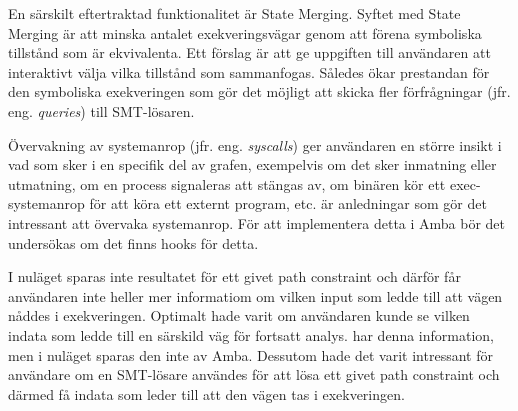 En särskilt eftertraktad funktionalitet är State Merging. Syftet
med State Merging är att minska antalet exekveringsvägar genom att förena
symboliska tillstånd som är ekvivalenta. Ett förslag är att ge uppgiften till
användaren att interaktivt välja vilka tillstånd som sammanfogas. Således ökar
prestandan för den symboliska exekveringen som gör det möjligt att skicka fler
förfrågningar (jfr. eng. \emph{queries}) till SMT-lösaren.

Övervakning av systemanrop (jfr. eng. \emph{syscalls}) ger användaren en större
insikt i vad som sker i en specifik del av grafen, exempelvis om det sker
inmatning eller utmatning, om en process signaleras att stängas av, om binären
kör ett exec-systemanrop för att köra ett externt program, etc. är anledningar
som gör det intressant att övervaka systemanrop. För att implementera detta i
Amba bör det undersökas om det finns hooks för detta.

I nuläget sparas inte resultatet för ett givet path constraint
och därför får användaren inte heller mer informatiom om vilken input som ledde
till att vägen nåddes i exekveringen. Optimalt hade varit om användaren kunde se
vilken indata som ledde till en särskild väg för fortsatt analys. \stoe{} har
denna information, men i nuläget sparas den inte av Amba. Dessutom hade det
varit intressant för användare om en SMT-lösare användes för att lösa ett givet
path constraint och därmed få indata som leder till att den vägen tas i
exekveringen.
